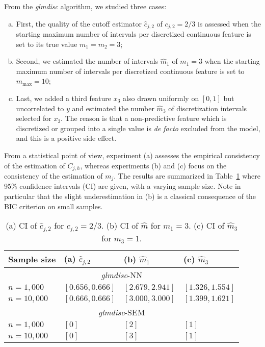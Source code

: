 From the \textit{glmdisc} algorithm, we studied three cases:
\begin{enumerate}[(a)]
    \item First, the quality of the cutoff estimator $\hat{c}_{j,2}$ of $c_{j,2} = 2/3$ is assessed when the starting maximum number of intervals per discretized continuous feature is set to its true value $m_1=m_2= 3$;
    \item Second, we estimated the number of intervals $\hat{m}_1$ of $m_1=3$ when the starting maximum number of intervals per discretized continuous feature is set to $m_{\text{max}} = 10$; 
    \item Last, we added a third feature $x_3$ also drawn uniformly on $[0,1]$ but uncorrelated to $y$ and estimated the number $\hat{m}_3$ of discretization intervals selected for $x_3$. The reason is that a non-predictive feature which is discretized or grouped into a single value is \textit{de facto} excluded from the model, and this is a positive side effect.
\end{enumerate}
From a statistical point of view, experiment (a) assesses the empirical consistency of the estimation of $C_{j,h}$, whereas experiments (b) and (c) focus on the consistency of the estimation of $m_j$. The results are summarized in Table~\ref{tab:estim_precision} where 95\% confidence intervals (CI) are given, with a varying sample size. Note in particular that the slight underestimation in (b) is a classical consequence of the BIC criterion on small samples. 
\begin{table}[h!]
    \centering
\begin{tabular}{llll}
Sample size & (a) $\hat{c}_{j,2}$ & (b) $\hat{m}_1$ & (c) $\hat{m}_3$\\
\hline
\hline
\multicolumn{4}{c}{\textit{glmdisc}-NN} \\
\hline
$n = 1,000$ & $[0.656,0.666]$ & $[2.679,2.941]$ & $[1.326,1.554]$ \\
$n = 10,000$ & $[0.666,0.666]$ & $[3.000,3.000]$ & $[1.399,1.621]$ \\
\hline
\multicolumn{4}{c}{\textit{glmdisc}-SEM} \\
\hline
$n = 1,000$ & $[0]$ & $[2]$ & $[1]$ \\
$n = 10,000$ & $[0]$ & $[3]$ & $[1]$ 
\end{tabular}
    \caption{(a) CI of $\hat{c}_{j,2}$ for $c_{j,2} = 2/3$. (b) CI of $\hat{m}$ for $m_1=3$. (c) CI of $\hat{m}_3$ for $m_3=1$.}
    \label{tab:estim_precision}
\end{table}


